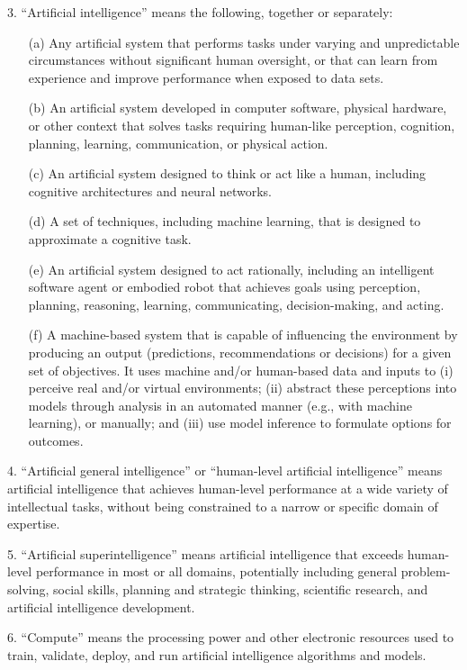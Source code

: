 \documentclass[12pt,a4paper]{article}
\begin{document}
3. “Artificial intelligence” means the following, together or separately:

\begin{enumerate}
    \item[(a)] Any artificial system that performs tasks under varying and unpredictable circumstances without significant human  oversight, or that can learn from experience and improve performance when exposed to data sets.
    \item[(b)] An artificial system developed in computer software, physical hardware, or other context that solves tasks requiring human-like perception, cognition, planning, learning, communication, or physical action.
    \item[(c)] An artificial system designed to think or act like a human, including cognitive architectures and neural networks.
    \item[(d)]A set of techniques, including machine learning, that is designed to approximate a cognitive task.
    \item[(e)]An artificial system designed to act rationally, including an intelligent software agent or embodied robot that  achieves goals using perception, planning, reasoning, learning, communicating, decision-making, and acting.
    \item[(f)] A machine-based system that is capable of influencing the environment by producing an output (predictions, recommendations or decisions) for a given set of objectives. It uses machine and/or human-based data and inputs to (i) perceive real and/or virtual environments; (ii) abstract these perceptions into models through analysis in an automated manner (e.g., with machine learning), or manually; and (iii) use model inference to formulate options for outcomes. 
\end{enumerate}

4. “Artificial general intelligence” or “human-level artificial intelligence” means artificial intelligence that achieves human-level performance at a wide variety of intellectual tasks, without being constrained to a narrow or specific domain of expertise.

5. “Artificial superintelligence” means artificial intelligence that exceeds human-level performance in most or all domains, potentially including general problem-solving, social skills, planning and strategic thinking, scientific research, and artificial intelligence development. 

6. “Compute” means the processing power and other electronic resources used to train, validate, deploy, and run artificial intelligence algorithms and models. 
\end{document}

